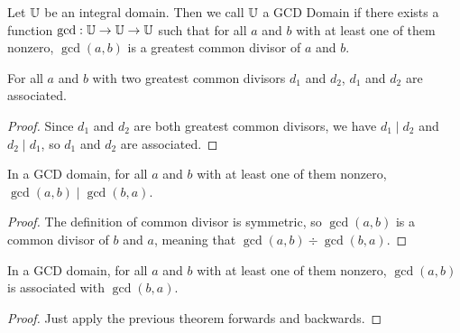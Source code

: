 \documentclass[../../math.tex]{subfiles}
\begin{document}
\begin{class}
    Let $\mathbb{U}$ be an integral domain.  Then we call $\mathbb{U}$ a GCD Domain if there
    exists a function $\gcd : \mathbb{U} \to \mathbb{U} \to \mathbb{U}$ such that for all $a$ and $b$
    with at least one of them nonzero, $\gcd(a, b)$ is a greatest common divisor
    of $a$ and $b$.
\end{class}

\begin{theorem} \label{gcd_associates}
    For all $a$ and $b$ with two greatest common divisors $d_1$ and $d_2$, $d_1$
    and $d_2$ are associated.
\end{theorem}
\begin{proof}
    Since $d_1$ and $d_2$ are both greatest common divisors, we have $d_1 \mid
    d_2$ and $d_2 \mid d_1$, so $d_1$ and $d_2$ are associated.
\end{proof}

\begin{theorem} \label{gcd_div_comm}
    In a GCD domain, for all $a$ and $b$ with at least one of them nonzero,
    $\gcd(a, b) \mid \gcd(b, a)$.
\end{theorem}
\begin{proof}
    The definition of common divisor is symmetric, so $\gcd(a, b)$ is a common
    divisor of $b$ and $a$, meaning that $\gcd(a, b) \div \gcd(b, a)$.
\end{proof}

\begin{theorem} \label{gcd_comm}
    In a GCD domain, for all $a$ and $b$ with at least one of them nonzero,
    $\gcd(a, b)$ is associated with $\gcd(b, a)$.
\end{theorem}
\begin{proof}
    Just apply the previous theorem forwards and backwards.
\end{proof}
\end{document}
